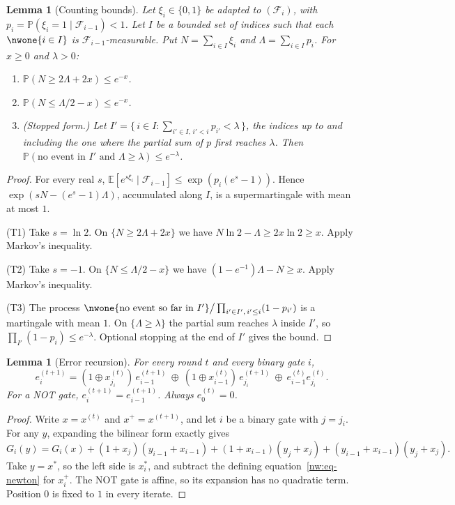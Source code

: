 \documentclass[11pt]{amsart}
\newtheorem{lemma}[theorem]{Lemma}
\theoremstyle{definition}
\theoremstyle{remark}
\newcommand{\PP}{\mathbb{P}}
\newcommand{\EE}{\mathbb{E}}
\newcommand{\cF}{\mathcal{F}}
\begin{document}
\begin{lemma}[Counting bounds]\label{nw:lem-counting}
Let $\xi_i\in\{0,1\}$ be adapted to $(\cF_i)$, with
$p_i=\PP(\xi_i=1\mid\cF_{i-1})<1$. Let $I$ be a bounded set of indices such
that each $\nwone\{i\in I\}$ is $\cF_{i-1}$-measurable. Put
$N=\sum_{i\in I}\xi_i$ and $\Lambda=\sum_{i\in I}p_i$. For $x\ge0$ and
$\lambda>0$:
\begin{enumerate}[label=\textup{(T\arabic*)},leftmargin=*]
\item $\PP(N\ge 2\Lambda+2x)\le e^{-x}$.
\item $\PP(N\le\Lambda/2-x)\le e^{-x}$.
\item \textup{(Stopped form.)} Let
  $I'=\{\,i\in I:\sum_{i'\in I,\,i'<i}p_{i'}<\lambda\,\}$, the indices up to
  and including the one where the partial sum of $p$ first reaches $\lambda$.
  Then $\PP(\text{no event in $I'$ and }\Lambda\ge\lambda)\le e^{-\lambda}$.
\end{enumerate}
\end{lemma}

\begin{proof}
For every real $s$, $\EE[e^{s\xi_i}\mid\cF_{i-1}]\le\exp(p_i(e^s-1))$. Hence
$\exp(sN-(e^s-1)\Lambda)$, accumulated along $I$, is a supermartingale with
mean at most $1$.

(T1) Take $s=\ln2$. On $\{N\ge2\Lambda+2x\}$ we have
$N\ln2-\Lambda\ge2x\ln2\ge x$. Apply Markov's inequality.

(T2) Take $s=-1$. On $\{N\le\Lambda/2-x\}$ we have $(1-e^{-1})\Lambda-N\ge x$.
Apply Markov's inequality.

(T3) The process
$\nwone\{\text{no event so far in }I'\}\big/\prod_{i'\in I',\,i'\le i}(1-p_{i'})$
is a martingale with mean $1$. On $\{\Lambda\ge\lambda\}$ the partial sum
reaches $\lambda$ inside $I'$, so $\prod_{I'}(1-p_i)\le e^{-\lambda}$.
Optional stopping at the end of $I'$ gives the bound.
\end{proof}

\begin{lemma}[Error recursion]\label{nw:lem-error}
For every round $t$ and every binary gate $i$,
\[
  e^{(t+1)}_i=(1\oplus x^{(t)}_{j_i})\,e^{(t+1)}_{i-1}\ \oplus\
  (1\oplus x^{(t)}_{i-1})\,e^{(t+1)}_{j_i}\ \oplus\
  e^{(t)}_{i-1}e^{(t)}_{j_i}.
\]
For a NOT gate, $e^{(t+1)}_i=e^{(t+1)}_{i-1}$. Always $e^{(t)}_0=0$.
\end{lemma}

\begin{proof}
Write $x=x^{(t)}$ and $x^+=x^{(t+1)}$, and let $i$ be a binary gate with
$j=j_i$. For any $y$, expanding the bilinear form exactly gives
\[
  G_i(y)=G_i(x)+(1+x_j)(y_{i-1}+x_{i-1})+(1+x_{i-1})(y_j+x_j)
  +(y_{i-1}+x_{i-1})(y_j+x_j).
\]
Take $y=x^*$, so the left side is $x^*_i$, and subtract the defining
equation~\eqref{nw:eq-newton} for $x^+_i$. The NOT gate is affine, so its
expansion has no quadratic term. Position $0$ is fixed to $1$ in every
iterate.
\end{proof}
\end{document}
